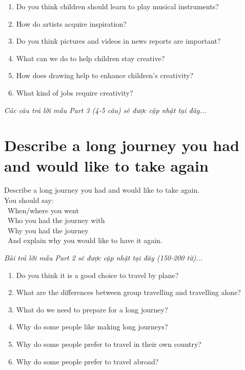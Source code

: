 \begin{ieltsprompt}
\begin{enumerate}[itemsep=4pt]
    \item Do you think children should learn to play musical instruments?
    \item How do artists acquire inspiration?
    \item Do you think pictures and videos in news reports are important?
    \item What can we do to help children stay creative?
    \item How does drawing help to enhance children's creativity?
    \item What kind of jobs require creativity?
\end{enumerate}
\end{ieltsprompt}

\vspace{1em}
\textit{Các câu trả lời mẫu Part 3 (4-5 câu) sẽ được cập nhật tại đây...}
\vspace{2em}

\section{Describe a long journey you had and would like to take again}
\begin{ieltsprompt}
Describe a long journey you had and would like to take again. \\
You should say: \\
\textbullet\ When/where you went \\
\textbullet\ Who you had the journey with \\
\textbullet\ Why you had the journey \\
\textbullet\ And explain why you would like to have it again. \\
\end{ieltsprompt}

\vspace{1em}
\textit{Bài trả lời mẫu Part 2 sẽ được cập nhật tại đây (150-200 từ)...}
\vspace{2em}

\begin{ieltsprompt}
\begin{enumerate}[itemsep=4pt]
    \item Do you think it is a good choice to travel by plane?
    \item What are the differences between group travelling and travelling alone?
    \item What do we need to prepare for a long journey?
    \item Why do some people like making long journeys?
    \item Why do some people prefer to travel in their own country?
    \item Why do some people prefer to travel abroad?
\end{enumerate}
\end{ieltsprompt}

